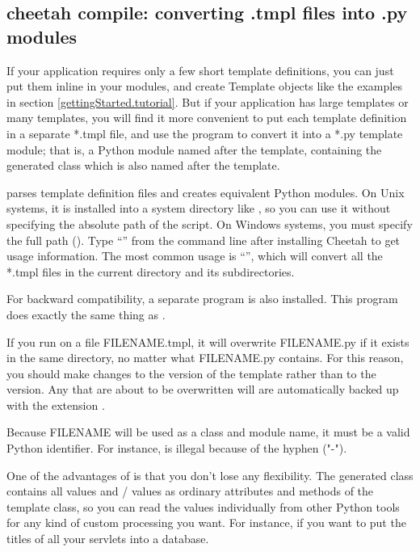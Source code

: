 \subsection{cheetah compile: converting .tmpl files into .py modules}
\label{howWorks.tmpl2py}
\label{howWorks.cheetah-compile}

If your application requires only a few short template definitions, you can
just put them inline in your modules, and create Template objects like the
examples in section \ref{gettingStarted.tutorial}.  But if your application
has large templates or many templates, you will find it more convenient to
put each template definition in a separate *.tmpl file, and use the
 program to convert it into a *.py template module; that
is, a Python module named after the template, containing the generated class
which is also named after the template.  

 parses template definition
files and creates equivalent Python modules.  On Unix systems, it is installed
into a system directory like , so you can use it without
specifying the absolute path of the script.  On Windows systems, you must
specify the full path (). Type
``'' from the command line after installing
Cheetah to get usage information.  The most common usage is
``'', which will convert all the *.tmpl files in the
current directory and its subdirectories.

For backward compatibility, a separate program  is also
installed.  This program does exactly the same thing as .

If you run  on a file FILENAME.tmpl, it will
overwrite FILENAME.py if it exists in the same directory, no matter what
FILENAME.py contains.  For this reason, you should make changes to the
 version of the template rather than to the  version.  Any
 that are about to be overwritten will are
automatically backed up with the extension .

Because FILENAME will be used as a class and module name, it must be a valid
Python identifier.  For instance,  is 
illegal because of the hyphen ("-").

One of the advantages of  is that you don't lose any
flexibility.  The generated class contains all  values and
/ values as ordinary attributes and methods of the
template class, so you can read the values individually from other Python
tools for any kind of custom processing you want.  For instance, if you want to
put the titles of all your servlets into a database.

